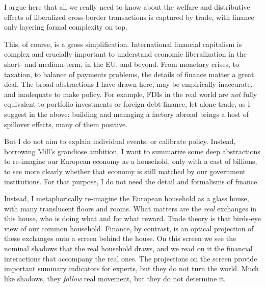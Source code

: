 \documentclass[11pt,a4paper,oneside,openright]{article}
\begin{document}
I argue here that all we really need to know about the welfare and distributive effects of liberalized cross-border transactions is captured by trade, with finance only layering formal complexity on top.

This, of course, is a gross simplification. 
International financial capitalism is complex and crucially important to understand economic liberalization in the short- and medium-term, in the \gls{EU}, and beyond. 
From monetary crises, to taxation, to balance of payments problems, the details of finance matter a great deal. 
The broad abstractions I have drawn here, may be empirically inaccurate, and inadequate to make policy. 
For example, \glspl{FDI} in the real world are \emph{not} fully equivalent to portfolio investments or foreign debt finance, let alone trade, as I suggest in the above: 
building and managing a factory abroad brings a host of spillover effects, many of them positive.

But I do not aim to explain individual events, or calibrate policy. 
Instead, borrowing Mill's grandiose ambition, I want to summarize some deep abstractions to re-imagine our European economy as a household, only with a cast of billions, to see more clearly whether that economy is still matched by our government institutions. 
For that purpose, I do not need the detail and formalisms of finance.

Instead, I metaphorically re-imagine the European household as a glass house, with many translucent floors and rooms. 
What matters are the \emph{real} exchanges in this house, who is doing what and for what reward. 
Trade theory is that birds-eye view of our common household. 
Finance, by contrast, is an optical projection of these exchanges onto a screen behind the house. 
On this screen we see the nominal shadows that the real household draws, and we read on it the financial interactions that accompany the real ones. 
The projections on the screen provide important summary indicators for experts, but they do not turn the world. 
Much like shadows, they \emph{follow} real movement, but they do not determine it.
\end{document}
